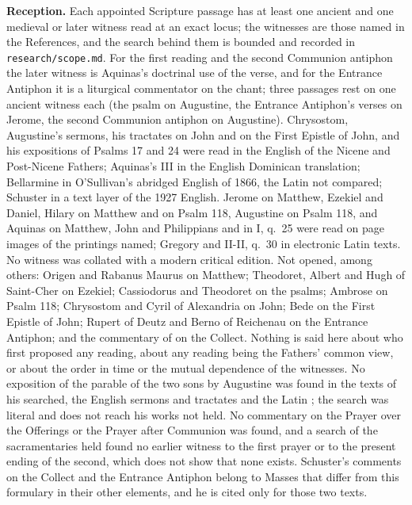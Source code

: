 {\textbf{Reception.} Each appointed Scripture passage has at least one ancient
and one medieval or later witness read at an exact locus; the witnesses are
those named in the References, and the search behind them is bounded and
recorded in \texttt{research/scope.md}. For the first reading and the second
Communion antiphon the later witness is Aquinas's doctrinal use of the verse,
and for the Entrance Antiphon it is a liturgical commentator on the chant;
three passages rest on one ancient witness each (the psalm on Augustine, the
Entrance Antiphon's verses on Jerome, the second Communion antiphon on
Augustine). Chrysostom, Augustine's sermons, his tractates on John and on the
First Epistle of John, and his expositions of Psalms 17 and 24 were read in the
English of the Nicene and Post-Nicene Fathers; Aquinas's  III in the
English Dominican translation; Bellarmine in O'Sullivan's abridged English of
1866, the Latin not compared; Schuster in a text layer of the 1927 English.
Jerome on Matthew, Ezekiel and Daniel, Hilary on Matthew and on Psalm 118,
Augustine on Psalm 118, and Aquinas on Matthew, John and Philippians and in
 I, q.~25 were read on page images of the printings named; Gregory
and  II-II, q.~30 in electronic Latin texts. No witness was collated
with a modern critical edition. Not opened, among others: Origen and Rabanus
Maurus on Matthew; Theodoret, Albert and Hugh of Saint-Cher on Ezekiel;
Cassiodorus and Theodoret on the psalms; Ambrose on Psalm 118; Chrysostom and
Cyril of Alexandria on John; Bede on the First Epistle of John; Rupert of Deutz
and Berno of Reichenau on the Entrance Antiphon; and the commentary of
 on the Collect. Nothing is said here about who first
proposed any reading, about any reading being the Fathers' common view, or
about the order in time or the mutual dependence of the witnesses. No
exposition of the parable of the two sons by Augustine was found in the texts
of his searched, the English sermons and tractates and the Latin
; the search was literal and does not reach his
works not held. No commentary on the Prayer over the Offerings or the Prayer
after Communion was found, and a search of the sacramentaries held found no
earlier witness to the first prayer or to the present ending of the second,
which does not show that none exists. Schuster's comments on the Collect and
the Entrance Antiphon belong to Masses that differ from this formulary in their
other elements, and he is cited only for those two texts.

}

